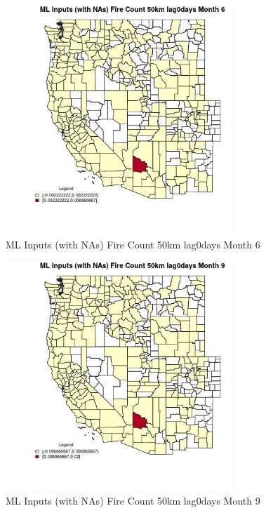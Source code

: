 \begin{figure} 
\centering  
\includegraphics[width=0.77\textwidth]{Code_Outputs/Report_ML_input_PM25_Step4_part_e_de_duplicated_aves_compiled_2019-05-21wNAs_CountyFire_Count_50km_lag0daysmedianMonth6.jpg} 
\caption{\label{fig:Report_ML_input_PM25_Step4_part_e_de_duplicated_aves_compiled_2019-05-21wNAsCountyFire_Count_50km_lag0daysmedianMonth6}ML Inputs (with NAs) Fire Count 50km lag0days Month 6} 
\end{figure} 
 

\clearpage 

\begin{figure} 
\centering  
\includegraphics[width=0.77\textwidth]{Code_Outputs/Report_ML_input_PM25_Step4_part_e_de_duplicated_aves_compiled_2019-05-21wNAs_CountyFire_Count_50km_lag0daysmedianMonth9.jpg} 
\caption{\label{fig:Report_ML_input_PM25_Step4_part_e_de_duplicated_aves_compiled_2019-05-21wNAsCountyFire_Count_50km_lag0daysmedianMonth9}ML Inputs (with NAs) Fire Count 50km lag0days Month 9} 
\end{figure} 
 

